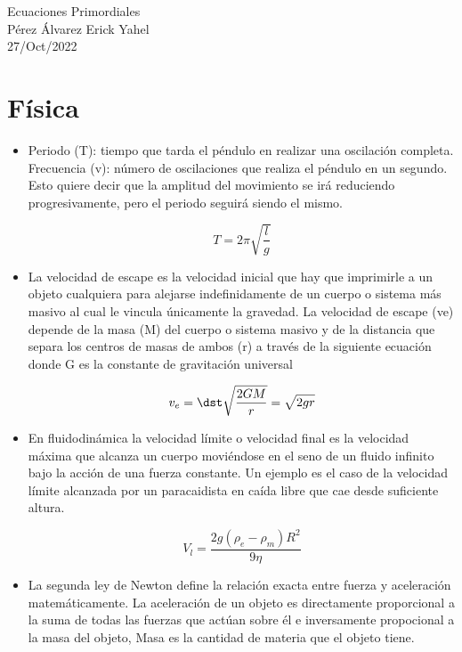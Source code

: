 \documentclass[letterpaper,12pt]{article}
\begin{document}
{\centering\huge{{Ecuaciones Primordiales}\\


Pérez Álvarez Erick Yahel\\
27/Oct/2022}\\}


\newpage
{}
\section{Física}
\begin{itemize}

    \item [\star]Periodo (T): tiempo que tarda el péndulo en realizar una oscilación completa. Frecuencia (v): número de oscilaciones que realiza el péndulo en un segundo. Esto quiere decir que la amplitud del movimiento se irá reduciendo progresivamente, pero el periodo seguirá siendo el mismo.
    
                                     $$ 	T=2\pi\sqrt{\dfrac{l}{g }}$$
    
    
    \item [\bigstar]La velocidad de escape es la velocidad inicial que hay que imprimirle a un objeto cualquiera para alejarse indefinidamente de un cuerpo o sistema más masivo al cual le vincula únicamente la gravedad. La velocidad de escape (ve) depende de la masa (M) del cuerpo o sistema masivo y de la distancia que separa los centros de masas de ambos (r) a través de la siguiente ecuación donde G es la constante de gravitación universal
    
                                     $$v_e=\dst\sqrt{\frac{2GM}{r}}=\sqrt{2gr}$$
    
    
    \item [\bullet]En fluidodinámica la velocidad límite o velocidad final es la velocidad máxima que alcanza un cuerpo moviéndose en el seno de un fluido infinito bajo la acción de una fuerza constante. Un ejemplo es el caso de la velocidad límite alcanzada por un paracaidista en caída libre que cae desde suficiente altura.
                      
                      
                      $$V_l=\dfrac{2g(\rho_e-\rho_m)R^2}{9\eta}$$
    
    
    
    
    \item [\circ]La segunda ley de Newton define la relación exacta entre fuerza y aceleración matemáticamente. La aceleración de un objeto es directamente proporcional a la suma de todas las fuerzas que actúan sobre él e inversamente propocional a la masa del objeto, Masa es la cantidad de materia que el objeto tiene.
    

\end{itemize}
\end{document}
